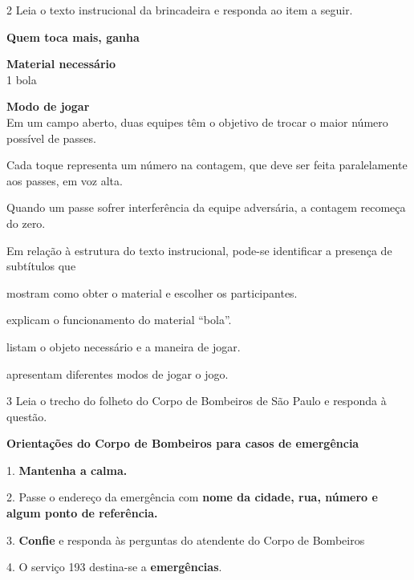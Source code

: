 \num{2} Leia o texto instrucional da brincadeira e responda ao item a seguir.


\begin{myquote}
\textbf{Quem toca mais, ganha}

\textbf{Material necessário}\\
1 bola

\textbf{Modo de jogar}\\
Em um campo aberto, duas equipes têm o
objetivo de trocar o maior número possível de passes.

Cada toque representa um número na contagem, que deve ser feita
paralelamente aos passes, em voz alta.

Quando um passe sofrer interferência da equipe adversária, a contagem
recomeça do zero.

\end{myquote}

Em relação à estrutura do texto instrucional, pode-se identificar a
presença de subtítulos que

\begin{escolha}
\item mostram como obter o material e escolher os participantes.

\item explicam o funcionamento do material ``bola''.

\item listam o objeto necessário e a maneira de jogar.

\item apresentam diferentes modos de jogar o jogo.
\end{escolha}

\num{3} Leia o trecho do folheto do Corpo de Bombeiros de São Paulo e responda à questão.
\begin{myquote}
\textbf{Orientações do Corpo de Bombeiros para casos de emergência}

1. \textbf{Mantenha a calma.}

2. Passe o endereço da emergência com \textbf{nome da cidade, rua, número e algum ponto de referência.}

3. \textbf{Confie} e responda às perguntas do atendente do Corpo de Bombeiros

4. O serviço 193 destina-se a \textbf{emergências}.

\end{myquote}

